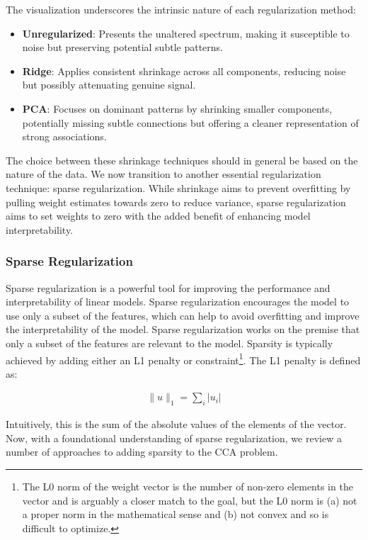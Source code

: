 The visualization underscores the intrinsic nature of each regularization method:
\begin{itemize}
    \item \textbf{Unregularized}: Presents the unaltered spectrum, making it susceptible to noise but preserving potential subtle patterns.
    \item \textbf{Ridge}: Applies consistent shrinkage across all components, reducing noise but possibly attenuating genuine signal.
    \item \textbf{PCA}: Focuses on dominant patterns by shrinking smaller components, potentially missing subtle connections but offering a cleaner representation of strong associations.
\end{itemize}
The choice between these shrinkage techniques should in general be based on the nature of the data.
We now transition to another essential regularization technique: sparse regularization.
While shrinkage aims to prevent overfitting by pulling weight estimates towards zero to reduce variance, sparse regularization aims to set \gls{weights} to zero with the added benefit of enhancing model interpretability.

\subsubsection{Sparse Regularization}

Sparse regularization is a powerful tool for improving the performance and interpretability of linear models.
Sparse regularization encourages the model to use only a subset of the features, which can help to avoid overfitting and improve the interpretability of the model.
Sparse regularization works on the premise that only a subset of the features are relevant to the model.
Sparsity is typically achieved by adding either an L1 penalty or constraint\footnote{The L0 norm of the weight vector is the number of non-zero elements in the vector and is arguably a closer match to the goal, but the L0 norm is (a) not a proper norm in the mathematical sense and (b) not convex and so is difficult to optimize.}.
The L1 penalty is defined as:

\begin{align}
    \|u\|_1 = \sum_i |u_i|
\end{align}

Intuitively, this is the sum of the absolute values of the elements of the vector.
Now, with a foundational understanding of sparse regularization, we review a number of approaches to adding sparsity to the CCA problem.

